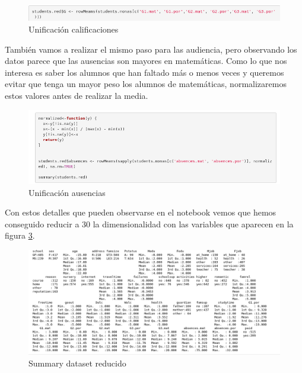 \documentclass[12pt,a4paper]{article}
\begin{document}
\begin{figure}[ht!]
	\centering
	\includegraphics[trim = 0mm 0mm 0mm 0mm, clip,scale=0.5]{images/red_calif}
	\caption{Unificación calificaciones}
	\label{fig:redcal}
\end{figure}


También vamos a realizar el mismo paso para las audiencia, pero observando los datos parece que las ausencias son mayores en matemáticas. Como lo que nos interesa es saber los alumnos que han faltado más o menos veces y queremos evitar que tenga un mayor peso los alumnos de matemáticas, normalizaremos estos valores antes de realizar la media. 

\begin{figure}[ht!]
	\centering
	\includegraphics[trim = 0mm 0mm 0mm 0mm, clip,scale=0.5]{images/red_aus}
	\caption{Unificación ausencias}
	\label{fig:redaus}
\end{figure}



Con estos detalles que pueden observarse en el notebook vemos que hemos conseguido reducir a 30 la dimensionalidad con las variables que aparecen en la figura \ref{fig:sum_red}.


\begin{figure}[ht!]
\centering
\includegraphics[trim = 0mm 0mm 0mm 0mm, clip,scale=0.4]{images/summary_nonas}
\caption{Summary dataset reducido}
\label{fig:sum_red}
\end{figure}
\end{document}
